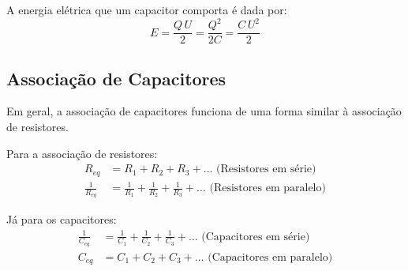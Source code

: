 \documentclass[12pt]{extarticle}
\newcommand{\<}{\langle}
\renewcommand{\>}{\rangle}
\theoremstyle{definition}
\begin{document}
A energia elétrica que um capacitor comporta é dada por:
\begin{equation}
    E = \frac{Q\,U}{2} = \frac{Q^2}{2C} = \frac{C\,U^2}{2}
\end{equation}

\subsection{Associação de Capacitores}
Em geral, a associação de capacitores funciona de uma forma similar à associação de resistores.

Para a associação de resistores:
\begin{equation}
    \begin{split}
        R_{eq} &= R_1 + R_2 + R_3 +\dots\, \,\text{(Resistores em série)}\\
        \frac{1}{R_{eq}} &= \frac{1}{R_1} + \frac{1}{R_2} + \frac{1}{R_3} + \dots\,\, \text{(Resistores em paralelo)}
    \end{split}
\end{equation}

Já para os capacitores:
\begin{equation}
    \boxed{\begin{split}
        \frac{1}{C_{eq}} &= \frac{1}{C_1} + \frac{1}{C_2} + \frac{1}{C_3} + \dots\,\, \text{(Capacitores em série)}\\
        C_{eq} &= C_1 + C_2 + C_3 +\dots\, \,\text{(Capacitores em paralelo)}
    \end{split}}
\end{equation}
\end{document}
